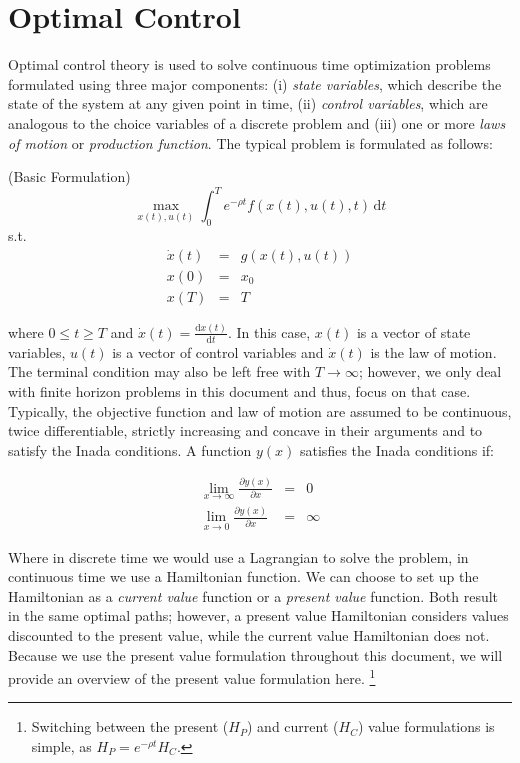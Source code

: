 \section{Optimal Control}
\label{section:mathappendix}


\noindent Optimal control theory is used to solve continuous time optimization problems formulated using three major components: (i) \textit{state variables}, which describe the state of the system at any given point in time, (ii) \textit{control variables}, which are analogous to the choice variables of a discrete problem and (iii) one or more \textit{laws of motion} or \textit{production function}. The typical problem is formulated as follows:


\begin{problem} \label{problem:basicform} (Basic Formulation)
\begin{equation}
\max_{x(t), u(t)} \int_0^T \! e^{- \rho t} f(x(t),u(t),t) \, \mathrm{d}t \label{eq:problem1}
\end{equation}
\noindent s.t.
\begin{eqnarray}
\dot{x}(t) &=& g(x(t),u(t)) \nonumber \\
x(0) &=& x_0 \nonumber \\
x(T) &=& T  \nonumber
\end{eqnarray}
\end{problem}

where $ 0\leq t \geq T $ and $\dot{x}(t) = \frac{\mathrm{d}x(t)}{\mathrm{d}t}$. In this case, $x(t) $ is a vector of state variables, $u(t) $ is a vector of control variables and $ \dot{x}(t) $ is the law of motion. The terminal condition may also be left free with $T \rightarrow \infty$; however, we only deal with finite horizon problems in this document and thus, focus on that case. Typically, the objective function and law of motion are assumed to be continuous, twice differentiable, strictly increasing and concave in their arguments and to satisfy the Inada conditions. A function $y(x)$ satisfies the Inada conditions if: 

\begin{eqnarray}
\lim_{ x \to \infty} \frac{\partial y(x)}{\partial x} &=& 0 \nonumber \\
\lim_{ x \to 0} \frac{\partial y(x)}{\partial x} &=& \infty \nonumber
\end{eqnarray}

Where in discrete time we would use a Lagrangian to solve the problem, in continuous time we use a Hamiltonian function. We can choose to set up the Hamiltonian as a \textit{current value} function or a \textit{present value} function. Both result in the same optimal paths; however, a present value Hamiltonian considers values discounted to the present value, while the current value Hamiltonian does not. Because we use the present value formulation throughout this document, we will provide an overview of the present value formulation here. \footnote{Switching between the present ($H_P$) and current ($H_C$) value formulations is simple, as $H_P = e^{-\rho t}H_C $.}

